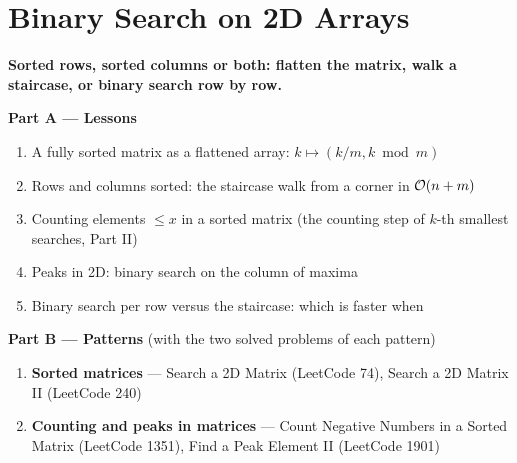 \chapter{Binary Search on 2D Arrays}
\label{ch:matrices}

\begin{tcolorbox}[enhanced, colback=white, colframe=secondaryblue, boxrule=1pt, arc=2mm]
\textbf{\large\textcolor{primaryblue}{Sorted rows, sorted columns or both: flatten the matrix, walk a staircase, or binary search row by row.}}
\end{tcolorbox}


\begin{plannedbox}
\textbf{Part A --- Lessons}
\begin{enumerate}[leftmargin=*, label=\textbf{A\arabic*.}, itemsep=1pt]
    \item A fully sorted matrix as a flattened array: $k \mapsto (k / m, k \bmod m)$
    \item Rows and columns sorted: the staircase walk from a corner in $\mathcal{O}(n + m)$
    \item Counting elements $\le x$ in a sorted matrix (the counting step of $k$-th smallest searches, Part II)
    \item Peaks in 2D: binary search on the column of maxima
    \item Binary search per row versus the staircase: which is faster when
\end{enumerate}
\textbf{Part B --- Patterns} (with the two solved problems of each pattern)
\begin{enumerate}[leftmargin=*, label=\textbf{P\arabic*.}, itemsep=1pt]
    \item \textbf{Sorted matrices} --- Search a 2D Matrix {\small\color{darkgray}(LeetCode 74)}, Search a 2D Matrix II {\small\color{darkgray}(LeetCode 240)}
    \item \textbf{Counting and peaks in matrices} --- Count Negative Numbers in a Sorted Matrix {\small\color{darkgray}(LeetCode 1351)}, Find a Peak Element II {\small\color{darkgray}(LeetCode 1901)}
\end{enumerate}
\end{plannedbox}
